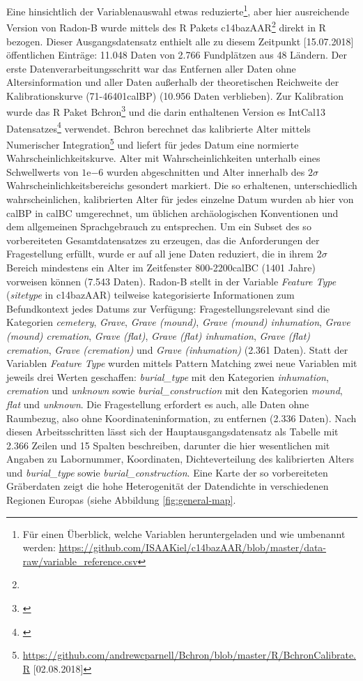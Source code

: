 \documentclass[openany,twoside,twocolumn]{book}
\let\rmarkdownfootnote\footnote%
\def\footnote{\protect\rmarkdownfootnote}
\begin{document}
Eine hinsichtlich der Variablenauswahl etwas reduzierte\footnote{Für
  einen Überblick, welche Variablen heruntergeladen und wie umbenannt
  werden:
  \url{https://github.com/ISAAKiel/c14bazAAR/blob/master/data-raw/variable_reference.csv}},
aber hier ausreichende Version von Radon-B wurde mittels des R Pakets
c14bazAAR\footnote{} direkt in R bezogen. Dieser Ausgangsdatensatz
enthielt alle zu diesem Zeitpunkt {[}15.07.2018{]} öffentlichen
Einträge: 11.048 Daten von 2.766 Fundplätzen aus 48 Ländern. Der erste
Datenverarbeitungsschritt war das Entfernen aller Daten ohne
Altersinformation und aller Daten außerhalb der theoretischen Reichweite
der Kalibrationskurve (71-46401calBP) (10.956 Daten verblieben). Zur
Kalibration wurde das R Paket Bchron\footnote{\textcite{haslett_simple_2008}}
und die darin enthaltenen Version es IntCal13 Datensatzes\footnote{\textcite{reimer_intcal13_2013}}
verwendet. Bchron berechnet das kalibrierte Alter mittels Numerischer
Integration\footnote{\url{https://github.com/andrewcparnell/Bchron/blob/master/R/BchronCalibrate.R}
  {[}02.08.2018{]}} und liefert für jedes Datum eine normierte
Wahrscheinlichkeitskurve. Alter mit Wahrscheinlichkeiten unterhalb eines
Schwellwerts von \(1\mathrm{e}{-6}\) wurden abgeschnitten und Alter
innerhalb des \(2\sigma\) Wahrscheinlichkeitsbereichs gesondert
markiert. Die so erhaltenen, unterschiedlich wahrscheinlichen,
kalibrierten Alter für jedes einzelne Datum wurden ab hier von calBP in
calBC umgerechnet, um üblichen archäologischen Konventionen und dem
allgemeinen Sprachgebrauch zu entsprechen. Um ein Subset des so
vorbereiteten Gesamtdatensatzes zu erzeugen, das die Anforderungen der
Fragestellung erfüllt, wurde er auf all jene Daten reduziert, die in
ihrem \(2\sigma\) Bereich mindestens ein Alter im Zeitfenster
800-2200calBC (1401 Jahre) vorweisen können (7.543 Daten). Radon-B
stellt in der Variable \emph{Feature Type} (\emph{sitetype} in
c14bazAAR) teilweise kategorisierte Informationen zum Befundkontext
jedes Datums zur Verfügung: Fragestellungsrelevant sind die Kategorien
\emph{cemetery}, \emph{Grave}, \emph{Grave (mound)}, \emph{Grave (mound)
inhumation}, \emph{Grave (mound) cremation}, \emph{Grave (flat)},
\emph{Grave (flat) inhumation}, \emph{Grave (flat) cremation},
\emph{Grave (cremation)} und \emph{Grave (inhumation)} (2.361 Daten).
Statt der Variablen \emph{Feature Type} wurden mittels Pattern Matching
zwei neue Variablen mit jeweils drei Werten geschaffen:
\emph{burial\_type} mit den Kategorien \emph{inhumation},
\emph{cremation} und \emph{unknown} sowie \emph{burial\_construction}
mit den Kategorien \emph{mound}, \emph{flat} und \emph{unknown}. Die
Fragestellung erfordert es auch, alle Daten ohne Raumbezug, also ohne
Koordinateninformation, zu entfernen (2.336 Daten). Nach diesen
Arbeitsschritten lässt sich der Hauptausgangsdatensatz als Tabelle mit
2.366 Zeilen und 15 Spalten beschreiben, darunter die hier wesentlichen
mit Angaben zu Labornummer, Koordinaten, Dichteverteilung des
kalibrierten Alters und \emph{burial\_type} sowie
\emph{burial\_construction}. Eine Karte der so vorbereiteten Gräberdaten
zeigt die hohe Heterogenität der Datendichte in verschiedenen Regionen
Europas (siehe Abbildung \ref{fig:general-map}.
\end{document}
